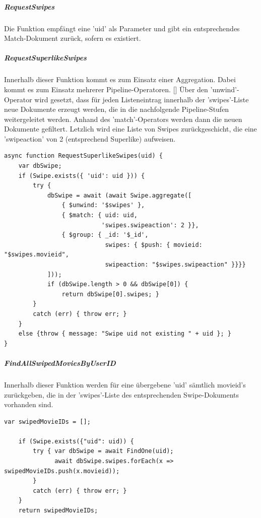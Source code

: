 \subparagraph{RequestSwipes}
Die Funktion empfängt eine 'uid' als Parameter und gibt ein entsprechendes Match-Dokument zurück, sofern es existiert.

\subparagraph{RequestSuperlikeSwipes}
Innerhalb dieser Funktion kommt es zum Einsatz einer Aggregation. 
Dabei kommt es zum Einsatz mehrerer Pipeline-Operatoren. []
Über den 'unwind'-Operator wird gesetzt, dass für jeden Listeneintrag innerhalb der 'swipes'-Liste neue Dokumente erzeugt werden, die in die nachfolgende Pipeline-Stufen weitergeleitet werden. Anhand des 'match'-Operators werden dann die neuen Dokumente gefiltert. Letzlich wird eine Liste von Swipes zurückgeschicht, die eine 'swipeaction' von 2 (entsprechend Superlike) aufweisen.

\begin{lstlisting}[caption=Swipe Service - RequestSuperlikeSwipes, label=lst:swipeserviceRequestSuperlikeSwipes]
async function RequestSuperlikeSwipes(uid) {
    var dbSwipe;
    if (Swipe.exists({ 'uid': uid })) {
        try {
            dbSwipe = await (await Swipe.aggregate([
                { $unwind: '$swipes' },
                { $match: { uid: uid,
                           'swipes.swipeaction': 2 }},
                { $group: { _id: '$_id',
                            swipes: { $push: { movieid: "$swipes.movieid",
                            swipeaction: "$swipes.swipeaction" }}}}
            ]));
            if (dbSwipe.length > 0 && dbSwipe[0]) {
                return dbSwipe[0].swipes; }
        }
        catch (err) { throw err; }
    }
    else {throw { message: "Swipe uid not existing " + uid }; }
}
\end{lstlisting}

\subparagraph{FindAllSwipedMoviesByUserID}
Innerhalb dieser Funktion werden für eine übergebene 'uid' sämtlich movieid's zurückgeben, die in der 'swipes'-Liste des entsprechenden Swipe-Dokuments vorhanden sind.

\begin{lstlisting}[caption=Swipe Service - AddSwipe, label=lst:swipeserviceaddswipe]
    var swipedMovieIDs = [];
    
    if (Swipe.exists({"uid": uid)) {
        try { var dbSwipe = await FindOne(uid);
              await dbSwipe.swipes.forEach(x => swipedMovieIDs.push(x.movieid));
        }
        catch (err) { throw err; }
    }
    return swipedMovieIDs;
\end{lstlisting}
